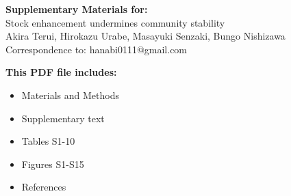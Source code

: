 \begin{center}
\LARGE{\textbf{Supplementary Materials for:}}\\[7.5mm]
\LARGE{Stock enhancement undermines community stability}\\[7.5mm]
\large{Akira Terui, Hirokazu Urabe, Masayuki Senzaki, Bungo Nishizawa}\\[7.5mm]
\large{Correspondence to: hanabi0111@gmail.com}\\[15mm]
\end{center}
\begin{flushleft}
\textbf{This PDF file includes:}
\begin{itemize}
\item Materials and Methods
\item Supplementary text
\item Tables S1-10
\item Figures S1-S15
\item References
\end{itemize}
\end{flushleft}

\newpage